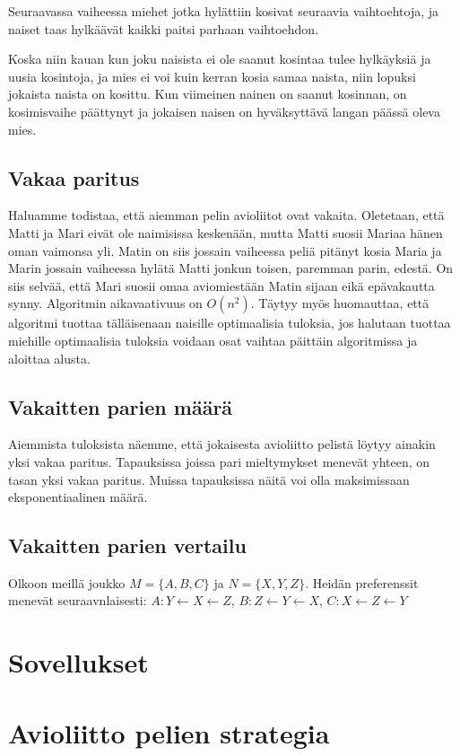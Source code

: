 \documentclass[finnish]{tktltiki2}
\theoremstyle{definition}
\theoremstyle{remark}
\begin{document}
Seuraavassa vaiheessa miehet jotka hylättiin kosivat seuraavia vaihtoehtoja, ja naiset taas hylkäävät kaikki paitsi parhaan vaihtoehdon.

Koska niin kauan kun joku naisista ei ole saanut kosintaa tulee hylkäyksiä ja uusia kosintoja, ja mies ei voi kuin kerran kosia samaa naista, niin lopuksi jokaista naista on kosittu. Kun viimeinen nainen on saanut kosinnan, on kosimisvaihe päättynyt ja jokaisen naisen on hyväksyttävä langan päässä oleva mies. \cite[p. 12-13]{gale62a}

\subsection{Vakaa paritus}
Haluamme todistaa, että aiemman pelin avioliitot ovat vakaita.
Oletetaan, että Matti ja Mari eivät ole naimisissa keskenään, mutta Matti suosii Mariaa hänen oman vaimonsa yli. Matin on siis jossain vaiheessa peliä pitänyt kosia Maria ja Marin jossain vaiheessa hylätä Matti jonkun toisen, paremman parin, edestä. On siis selvää, että Mari suosii omaa aviomiestään Matin sijaan eikä epävakautta synny. \cite[p. 13]{gale62a} Algoritmin aikavaativuus on $O(n^2)$. Täytyy myös huomauttaa, että algoritmi tuottaa tälläisenaan naisille optimaalisia tuloksia, jos halutaan tuottaa miehille optimaalisia tuloksia voidaan osat vaihtaa päittäin algoritmissa ja aloittaa alusta.

\subsection{Vakaitten parien määrä}
Aiemmista tuloksista näemme, että jokaisesta avioliitto pelistä löytyy ainakin yksi vakaa paritus. Tapauksissa joissa pari mieltymykset menevät yhteen, on tasan yksi vakaa paritus. Muissa tapauksissa näitä voi olla maksimissaan eksponentiaalinen määrä. \cite[p. 591]{Balinski}

\subsection{Vakaitten parien vertailu}
Olkoon meillä joukko $M = \{A, B, C\}$ ja $N = \{X, Y, Z\}$. Heidän preferenssit menevät seuraavnlaisesti:
$A: Y \leftarrow X \leftarrow Z$, $B: Z \leftarrow Y \leftarrow X$, $C: X \leftarrow Z \leftarrow Y$ \\

\section{Sovellukset}

\section{Avioliitto pelien strategia}

 

%
%
 
%

%


\lastpage
\end{document}
